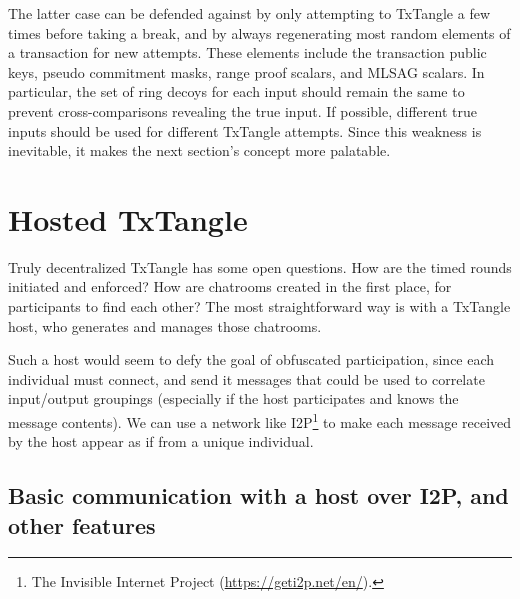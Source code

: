 The latter case can be defended against by only attempting to TxTangle a few times before taking a break, and by always regenerating most random elements of a transaction for new attempts. These elements include the transaction public keys, pseudo commitment masks, range proof scalars, and MLSAG scalars. In particular, the set of ring decoys for each input should remain the same to prevent cross-comparisons revealing the true input. If possible, different true inputs should be used for different TxTangle attempts. Since this weakness is inevitable, it makes the next section's concept more palatable.



\section{Hosted TxTangle}
\label{sec:hosted-txtangle}

Truly decentralized TxTangle has some open questions. How are the timed rounds initiated and enforced? How are chatrooms created in the first place, for participants to find each other? The most straightforward way is with a TxTangle host, who generates and manages those chatrooms.

Such a host would seem to defy the goal of obfuscated participation, since each individual must connect, and send it messages that could be used to correlate input/output groupings (especially if the host participates and knows the message contents). We can use a network like I2P\footnote{The Invisible Internet Project (\url{https://geti2p.net/en/}).} to make each message received by the host appear as if from a unique individual.


\subsection{Basic communication with a host over I2P, and other features}
\label{subsec:txtangle-host-communication}

